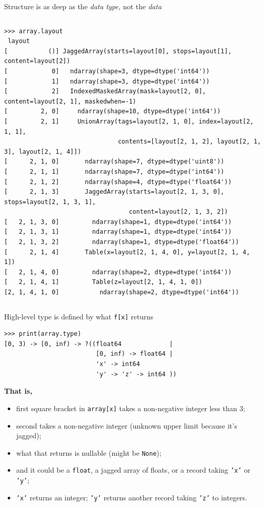 \documentclass[aspectratio=169]{beamer}
\begin{document}
\begin{frame}[fragile]{Structure is as deep as the {\it data type,} not the {\it data}}
\begin{columns}
\scriptsize
\begin{verbatim}
>>> array.layout
 layout 
[           ()] JaggedArray(starts=layout[0], stops=layout[1], content=layout[2])
[            0]   ndarray(shape=3, dtype=dtype('int64'))
[            1]   ndarray(shape=3, dtype=dtype('int64'))
[            2]   IndexedMaskedArray(mask=layout[2, 0], content=layout[2, 1], maskedwhen=-1)
[         2, 0]     ndarray(shape=10, dtype=dtype('int64'))
[         2, 1]     UnionArray(tags=layout[2, 1, 0], index=layout[2, 1, 1],
                               contents=[layout[2, 1, 2], layout[2, 1, 3], layout[2, 1, 4]])
[      2, 1, 0]       ndarray(shape=7, dtype=dtype('uint8'))
[      2, 1, 1]       ndarray(shape=7, dtype=dtype('int64'))
[      2, 1, 2]       ndarray(shape=4, dtype=dtype('float64'))
[      2, 1, 3]       JaggedArray(starts=layout[2, 1, 3, 0], stops=layout[2, 1, 3, 1],
                                  content=layout[2, 1, 3, 2])
[   2, 1, 3, 0]         ndarray(shape=1, dtype=dtype('int64'))
[   2, 1, 3, 1]         ndarray(shape=1, dtype=dtype('int64'))
[   2, 1, 3, 2]         ndarray(shape=1, dtype=dtype('float64'))
[      2, 1, 4]       Table(x=layout[2, 1, 4, 0], y=layout[2, 1, 4, 1])
[   2, 1, 4, 0]         ndarray(shape=2, dtype=dtype('int64'))
[   2, 1, 4, 1]         Table(z=layout[2, 1, 4, 1, 0])
[2, 1, 4, 1, 0]           ndarray(shape=2, dtype=dtype('int64'))
\end{verbatim}
\end{columns}
\end{frame}

\begin{frame}[fragile]{High-level type is defined by what \texttt{f[x]} returns}
\small
\begin{verbatim}
>>> print(array.type)
[0, 3) -> [0, inf) -> ?((float64             |
                         [0, inf) -> float64 |
                         'x' -> int64
                         'y' -> 'z' -> int64 ))
\end{verbatim}

\normalsize
\vspace{0.5 cm}
{\bf That is,}
\begin{itemize}
\item first square bracket in \texttt{array[x]} takes a non-negative integer less than 3;
\item second takes a non-negative integer (unknown upper limit because it's jagged);
\item what that returns is nullable (might be \texttt{None});
\item and it could be a \texttt{float}, a jagged array of floats, or a record taking \texttt{'x'} or \texttt{'y'};
\item \texttt{'x'} returns an integer; \texttt{'y'} returns another record taking \texttt{'z'} to integers.
\end{itemize}
\end{frame}
\end{document}
